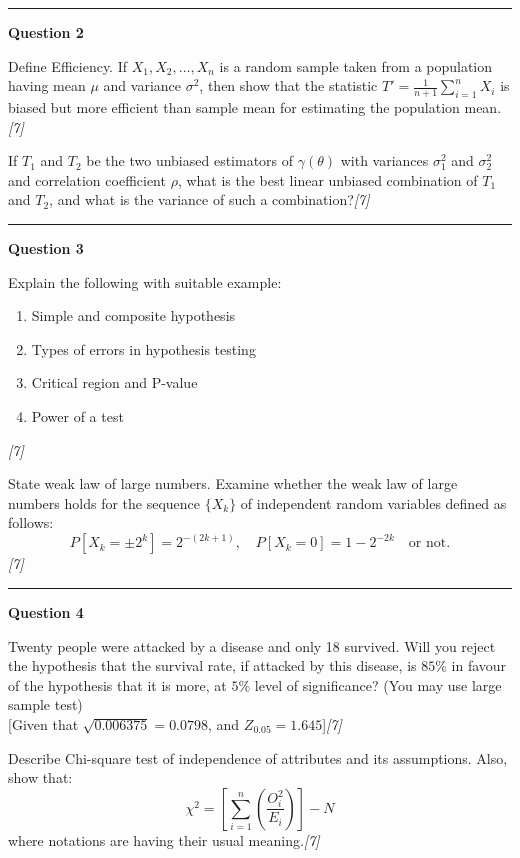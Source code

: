 \documentclass[11pt,a4paper]{article}
\newcommand{\pts}[1]{\hfill   \textit{[#1]}}
\begin{document}
\medskip\rule{\linewidth}{0.2pt}\medskip




\noindent   \textbf{Question 2}

\begin{parts}
  \item Define Efficiency. If $X_1, X_2, \dots, X_n$ is a random sample taken from a population having mean $\mu$ and variance $\sigma^2$, then show that the statistic $T' = \frac{1}{n+1}\sum_{i=1}^n X_i$ is biased but more efficient than sample mean for estimating the population mean.\pts{7}
  \item If $T_1$ and $T_2$ be the two unbiased estimators of $\gamma( \theta)$ with variances $\sigma_1^2$ and $\sigma_2^2$ and correlation coefficient $\rho$, what is the best linear unbiased combination of $T_1$ and $T_2$, and what is the variance of such a combination?\pts{7}
\end{parts}

\medskip\rule{\linewidth}{0.2pt}\medskip




\noindent   \textbf{Question 3}

\begin{parts}
  \item Explain the following with suitable example:
  
\begin{enumerate}[label=(\roman*)]
    \item Simple and composite hypothesis
    \item Types of errors in hypothesis testing
    \item Critical region and P-value
    \item Power of a test
  \end{enumerate}\pts{7}
  \item State weak law of large numbers. Examine whether the weak law of large numbers holds for the sequence $\{X_k\}$ of independent random variables defined as follows:
  \[ P[X_k = \pm 2^k] = 2^{-(2k+1)}, \quad P[X_k = 0] = 1 - 2^{-2k} \quad  \text{or not.} \]\pts{7}
\end{parts}

\medskip\rule{\linewidth}{0.2pt}\medskip




\noindent   \textbf{Question 4}

\begin{parts}
  \item Twenty people were attacked by a disease and only 18 survived. Will you reject the hypothesis that the survival rate, if attacked by this disease, is $85\%$ in favour of the hypothesis that it is more, at $5\%$ level of significance? (You may use large sample test) \\
  {[Given that $\sqrt{0.006375} = 0.0798$, and $Z_{0.05} = 1.645$]}\pts{7}
  \item Describe Chi-square test of independence of attributes and its assumptions. Also, show that:
  \[ \chi^2 = \left[ \sum_{i=1}^n \left(\frac{O_i^2}{E_i}\right) \right] - N \]
  where notations are having their usual meaning.\pts{7}
\end{parts}
\end{document}
